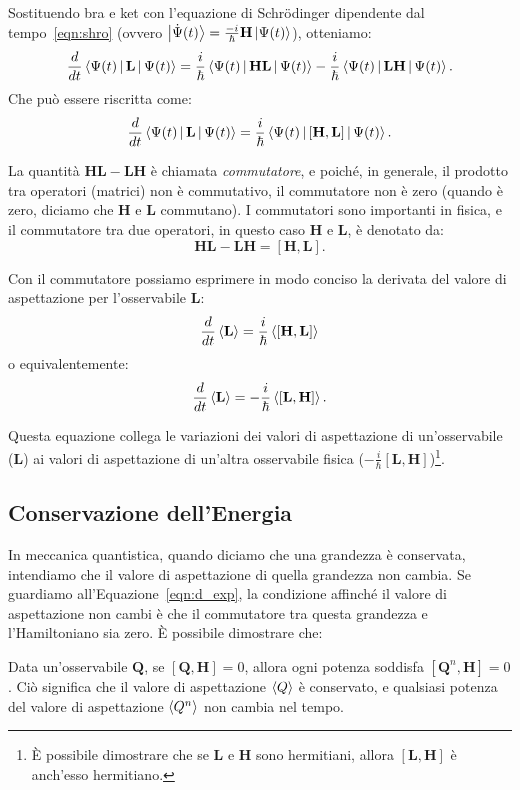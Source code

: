 Sostituendo bra e ket con l'equazione di Schrödinger dipendente dal tempo~\ref{eqn:shro} (ovvero $\Ket{\dot{\Psi}(t)} = \frac{- i}{\hbar}\mathbf{H}\Ket{\Psi(t)}$), otteniamo:
\[
\frac{d}{dt}\Braket{\Psi(t)|\mathbf{L}|\Psi(t)} = \frac{i}{\hbar}\Braket{\Psi(t)|\mathbf{H}\mathbf{L}|\Psi(t)} - \frac{i}{\hbar} \Braket{\Psi(t)|\mathbf{L}\mathbf{H}|\Psi(t)}.
\]
Che può essere riscritta come:
\[
\frac{d}{dt}\Braket{\Psi(t)|\mathbf{L}|\Psi(t)} = \frac{i}{\hbar}\Braket{\Psi(t)|[\mathbf{H}, \mathbf{L}]|\Psi(t)}.
\]

La quantità $\mathbf{H}\mathbf{L} - \mathbf{L}\mathbf{H}$ è chiamata \emph{commutatore}, e poiché, in generale, il prodotto tra operatori (matrici) non è commutativo, il commutatore non è zero (quando è zero, diciamo che $\mathbf{H}$ e $\mathbf{L}$ commutano). I commutatori sono importanti in fisica, e il commutatore tra due operatori, in questo caso $\mathbf{H}$ e $\mathbf{L}$, è denotato da:
\[
\mathbf{H}\mathbf{L} - \mathbf{L}\mathbf{H} = [\mathbf{H},\mathbf{L}].
\]

Con il commutatore possiamo esprimere in modo conciso la derivata del valore di aspettazione per l'osservabile $\mathbf{L}$:
\begin{equation}
	\frac{d}{dt} \Braket{\mathbf{L}} = \frac{i}{\hbar}\Braket{[\mathbf{H},\mathbf{L}]}
\end{equation}
o equivalentemente:
\begin{equation}
	\label{eqn:d_exp}
	\frac{d}{dt} \Braket{\mathbf{L}} = -\frac{i}{\hbar}\Braket{[\mathbf{L},\mathbf{H}]}.
\end{equation}

Questa equazione collega le variazioni dei valori di aspettazione di un'osservabile ($\mathbf{L}$) ai valori di aspettazione di un'altra osservabile fisica ($-\frac{i}{\hbar}[\mathbf{L},\mathbf{H}]$)\footnote{È possibile dimostrare che se $\mathbf{L}$ e $\mathbf{H}$ sono hermitiani, allora $[\mathbf{L}, \mathbf{H}]$ è anch'esso hermitiano.}.

\subsection{Conservazione dell'Energia}
In meccanica quantistica, quando diciamo che una grandezza è conservata, intendiamo che il valore di aspettazione di quella grandezza non cambia. Se guardiamo all'Equazione~\ref{eqn:d_exp}, la condizione affinché il valore di aspettazione non cambi è che il commutatore tra questa grandezza e l'Hamiltoniano sia zero. È possibile dimostrare che:
\begin{theorem}
	Data un'osservabile $\mathbf{Q}$, se $[\mathbf{Q},\mathbf{H}]=0$, allora ogni potenza soddisfa $[\mathbf{Q}^n,\mathbf{H}] = 0$. Ciò significa che il valore di aspettazione $\Braket{Q}$ è conservato, e qualsiasi potenza del valore di aspettazione $\Braket{Q^n}$ non cambia nel tempo.
\end{theorem}


